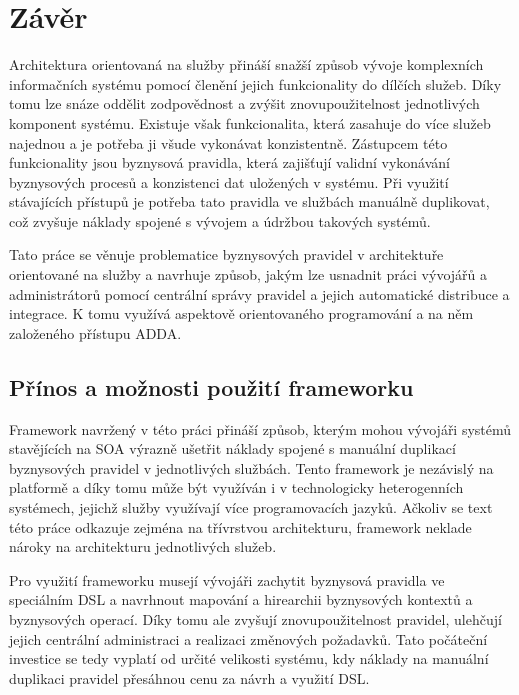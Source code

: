 

\chapter{Závěr}\label{ch:zaver}

Architektura orientovaná na služby přináší snažší způsob vývoje komplexních
informačních systému pomocí členění jejich funkcionality do dílčích služeb. Díky
tomu lze snáze oddělit zodpovědnost a zvýšit znovupoužitelnost jednotlivých
komponent systému. Existuje však funkcionalita, která zasahuje do více služeb
najednou a je potřeba ji všude vykonávat konzistentně. Zástupcem této funkcionality jsou
byznysová pravidla, která zajišťují validní vykonávání byznysových procesů
a konzistenci dat uložených v systému. Při využití stávajících přístupů je
potřeba tato pravidla ve službách manuálně duplikovat, což zvyšuje náklady
spojené s vývojem a údržbou takových systémů.

Tato práce se věnuje problematice byznysových pravidel v architektuře orientované
na služby a navrhuje způsob, jakým lze usnadnit práci vývojářů a administrátorů
pomocí centrální správy pravidel a jejich automatické distribuce a integrace.
K tomu využívá aspektově orientovaného programování a na něm založeného
přístupu \gls{ADDA}.

\section{Přínos a možnosti použití frameworku}

Framework navržený v této práci přináší způsob, kterým mohou vývojáři systémů
stavějících na \gls{SOA} výrazně ušetřit náklady spojené s manuální duplikací
byznysových pravidel v jednotlivých službách. Tento framework je nezávislý na
platformě a díky tomu může být využíván i v technologicky heterogenních systémech,
jejichž služby využívají více programovacích jazyků. Ačkoliv se text této práce odkazuje
zejména na třívrstvou architekturu, framework neklade nároky na architekturu jednotlivých
služeb.

Pro využití frameworku musejí vývojáři zachytit byznysová pravidla ve speciálním
\gls{DSL} a navrhnout mapování a hirearchii byznysových kontextů a byznysových operací.
Díky tomu ale zvyšují znovupoužitelnost pravidel, ulehčují jejich centrální administraci
a realizaci změnových požadavků. Tato počáteční investice se tedy vyplatí od určité velikosti systému,
kdy náklady na manuální duplikaci pravidel přesáhnou cenu za návrh a využití \gls{DSL}.


